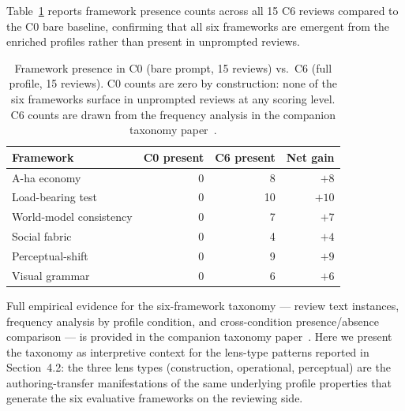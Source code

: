 Table~\ref{tab:framework-presence} reports framework presence counts across all 15 C6 reviews compared to the C0 bare baseline, confirming that all six frameworks are emergent from the enriched profiles rather than present in unprompted reviews.

\begin{table}[h]
\centering
\caption{Framework presence in C0 (bare prompt, 15 reviews) vs.\ C6 (full profile, 15 reviews). C0 counts are zero by construction: none of the six frameworks surface in unprompted reviews at any scoring level. C6 counts are drawn from the frequency analysis in the companion taxonomy paper~\cite{paper3taxonomy}.}
\label{tab:framework-presence}
\begin{tabular}{lrrr}
\toprule
Framework & C0 present & C6 present & Net gain \\
\midrule
A-ha economy & 0 & 8 & $+8$ \\
Load-bearing test & 0 & 10 & $+10$ \\
World-model consistency & 0 & 7 & $+7$ \\
Social fabric & 0 & 4 & $+4$ \\
Perceptual-shift & 0 & 9 & $+9$ \\
Visual grammar & 0 & 6 & $+6$ \\
\bottomrule
\end{tabular}
\end{table}

Full empirical evidence for the six-framework taxonomy --- review text instances, frequency analysis by profile condition, and cross-condition presence/absence comparison --- is provided in the companion taxonomy paper~\cite{paper3taxonomy}. Here we present the taxonomy as interpretive context for the lens-type patterns reported in Section~4.2: the three lens types (construction, operational, perceptual) are the authoring-transfer manifestations of the same underlying profile properties that generate the six evaluative frameworks on the reviewing side.
